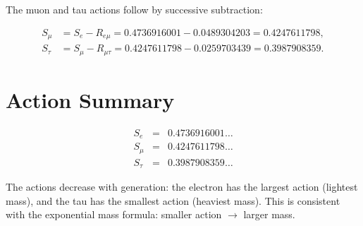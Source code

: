 The muon and tau actions follow by successive subtraction:

\[
\begin{aligned}
S_\mu &= S_e - R_{e\mu}
      = 0.4736916001 - 0.0489304203
      = 0.4247611798, \\[4pt]
S_\tau &= S_\mu - R_{\mu\tau}
       = 0.4247611798 - 0.0259703439
       = 0.3987908359.
\end{aligned}
\]

\section{Action Summary}

\[
\begin{array}{lcl}
S_e &=& 0.4736916001 \ldots \\
S_\mu &=& 0.4247611798 \ldots \\
S_\tau &=& 0.3987908359 \ldots
\end{array}
\]

The actions decrease with generation: the electron has the largest action
(lightest mass), and the tau has the smallest action (heaviest mass).  This
is consistent with the exponential mass formula: smaller action \(\to\)
larger mass.
